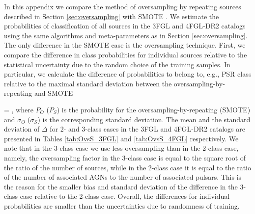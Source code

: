 In this appendix we compare the method of oversampling by repeating sources described in Section \ref{sec:oversampling} 
with SMOTE \citep{2011arXiv1106.1813C}.
We estimate the probabilities of classification of all sources in the 3FGL and 4FGL-DR2 catalogs using the same algorithms and meta-parameters as in Section \ref{sec:oversampling}.
The only difference in the SMOTE case is the oversampling technique.
First, we compare the difference in class probabilities for individual sources relative to the statistical uncertainty due to the random choice of the training samples.
In particular, we calculate the difference of probabilities to belong to, e.g., PSR class relative to the maximal standard deviation
between the oversampling-by-repeating and SMOTE

\be
{}
\Delta = ,
\ee
where $P_O$ ($P_S$) is the probability for the oversampling-by-repeating (SMOTE) and $\sigma_O$ ($\sigma_S$) is the corresponding standard deviation. 
The mean and the standard deviation of $\Delta$ for 2- and 3-class cases in the 3FGL and 4FGL-DR2 catalogs are presented in 
Tables \ref{tab:OvsS_3FGL} and \ref{tab:OvsS_4FGL} respectively.
We note that in the 3-class case we use less oversampling than in the 2-class case, namely, the oversampling factor in the 3-class case is equal to the square root of the ratio of the number of sources, while in the 2-class case it is equal to the ratio of the number of associated AGNs to the number of associated pulsars.
This is the reason for the smaller bias and standard deviation of the difference in the 3-class case relative to the 2-class case.
Overall, the differences for individual probabilities are smaller than the uncertainties due to randomness of training.

